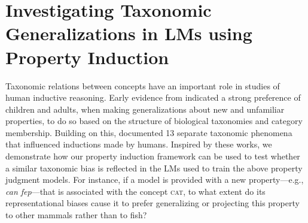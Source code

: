 \documentclass[10pt,letterpaper]{article}
\begin{document}
\section{Investigating Taxonomic Generalizations in LMs using Property Induction}
Taxonomic relations between concepts have an important role in studies of human inductive reasoning.
Early evidence from \citet{gelman1986categories} indicated a strong preference of children and adults, when making generalizations about new and unfamiliar properties, to do so based on the structure of biological taxonomies and category membership.
Building on this, \citet{osherson1990category} documented 13 separate taxonomic phenomena that influenced inductions made by humans.
Inspired by these works, we demonstrate how our property induction framework can be used to test whether a similar taxonomic bias is reflected in the LMs used to train the above property judgment models. 
For instance, if a model is provided with a new property---e.g., \textit{can fep}---that is associated with the concept \textsc{cat}, to what extent do its representational biases cause it to prefer generalizing or projecting this property to other mammals rather than to fish? 
\end{document}
